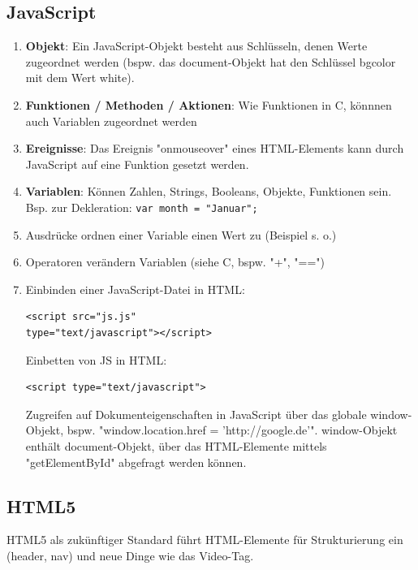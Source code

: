 \documentclass[12pt,landscape]{article}
\begin{document}
\begin{multicols}{3}
\subsection{JavaScript}
\begin{enumerate}
\item \textbf{Objekt}: Ein JavaScript-Objekt besteht aus Schlüsseln, denen Werte zugeordnet werden (bspw. das document-Objekt hat den Schlüssel bgcolor mit dem Wert white).
\item \textbf{Funktionen / Methoden / Aktionen}: Wie Funktionen in C, könnnen auch Variablen zugeordnet werden
\item \textbf{Ereignisse}: Das Ereignis "onmouseover" eines HTML-Elements kann durch JavaScript auf eine Funktion gesetzt werden.
\item \textbf{Variablen}: Können Zahlen, Strings, Booleans, Objekte, Funktionen sein. Bsp. zur Dekleration: \lstinline|var month = "Januar";|
\item Ausdrücke ordnen einer Variable einen Wert zu (Beispiel s. o.)
\item Operatoren verändern Variablen (siehe C, bspw. "+", "==")
\item Einbinden einer JavaScript-Datei in HTML: \begin{lstlisting}
<script src="js.js"
type="text/javascript"></script>
\end{lstlisting}
Einbetten von JS in HTML:
\begin{lstlisting}
<script type="text/javascript">
\end{lstlisting}
Zugreifen auf Dokumenteigenschaften in JavaScript über das globale window-Objekt, bspw. "window.location.href = 'http://google.de'". window-Objekt enthält document-Objekt, über das HTML-Elemente mittels "getElementById" abgefragt werden können.\\
\end{enumerate}
\subsection{HTML5}
HTML5 als zukünftiger Standard führt HTML-Elemente für Strukturierung ein (header, nav) und neue Dinge wie das Video-Tag.\\

\end{multicols}
\end{document}
